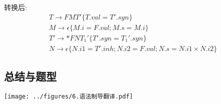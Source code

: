 转换后:
\begin{equation}
    \begin{aligned}
         & T \rightarrow FMT'\{T.val = T'.syn\}                                                     \\
         & M \rightarrow \epsilon \{M.i = F.val; M.s = M.i\}                                        \\
         & T' \rightarrow *FNT_1 ' \{T'.syn = T_1 '.syn\}                                           \\
         & N \rightarrow \epsilon \{N.i1 = T'.inh; N.i2 = F.val; N.s = N.i1 \times N.i2\} \nonumber
    \end{aligned}
\end{equation}

\subsection{总结与题型}

\texttt{[image: ../figures/6.语法制导翻译.pdf]}

\newpage